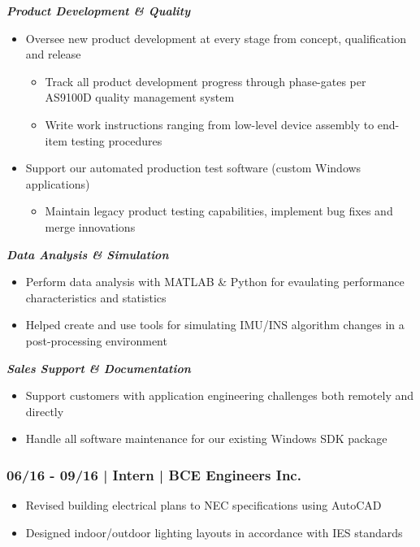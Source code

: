 \documentclass[]{article}
\begin{document}
\noindent\textbf{\emph{Product Development \& Quality}}
\begin{itemize}
    \setlength\itemsep{0.05em}
    \item Oversee new product development at every stage from concept, qualification and release
    \begin{itemize}
        \setlength\itemsep{0.05em}
        \item Track all product development progress through phase-gates per AS9100D quality management system
        \item Write work instructions ranging from low-level device assembly to end-item testing procedures
    \end{itemize}
    \item Support our automated production test software (custom Windows applications)
    \begin{itemize}
        \setlength\itemsep{0.05em}
        \item Maintain legacy product testing capabilities, implement bug fixes and merge innovations
    \end{itemize}
\end{itemize}

\noindent\textbf{\emph{Data Analysis \& Simulation}}
\begin{itemize}
    \setlength\itemsep{0.05em}
    \item Perform data analysis with MATLAB \& Python for evaulating performance characteristics and statistics
    \item Helped create and use tools for simulating IMU/INS algorithm changes in a post-processing environment
\end{itemize}

\noindent\textbf{\emph{Sales Support \& Documentation}}
\begin{itemize}
    \setlength\itemsep{0.05em}
    \item Support customers with application engineering challenges both remotely and directly
    \item Handle all software maintenance for our existing Windows SDK package
\end{itemize}



\subsubsection*{06/16 - 09/16 | Intern | BCE Engineers Inc.}
\begin{itemize}
    \setlength\itemsep{0.05em}
    \item Revised building electrical plans to NEC specifications using AutoCAD
    \item Designed indoor/outdoor lighting layouts in accordance with IES standards 
\end{itemize}
\end{document}

